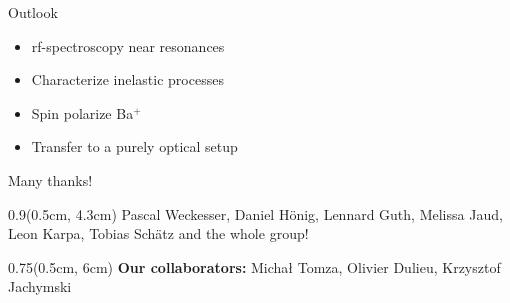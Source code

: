 \begin{frame}[c]{Outlook}
    \begin{itemize}
        \setlength\itemsep{1em}
        \item<1-> rf-spectroscopy near resonances
        \item<2-> Characterize inelastic processes
        \item<3-> Spin polarize Ba$^+$
        \item<4-> Transfer to a purely optical setup
    \end{itemize} 
\end{frame}


\begin{frame}[t]{Many thanks!}
    
    \begin{textblock*}{0.9\linewidth}(0.5cm, 4.3cm)
        Pascal Weckesser, Daniel Hönig, Lennard Guth, Melissa Jaud,
        Leon Karpa, Tobias Schätz and the whole group!
    \end{textblock*}
    \begin{textblock*}{0.75\linewidth}(0.5cm, 6cm)
        \textbf{Our collaborators:} Michał Tomza, Olivier Dulieu, Krzysztof Jachymski
    \end{textblock*}
\end{frame}
